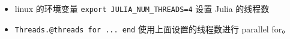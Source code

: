 
\begin{issues}
\issueDraft
\end{issues}

\begin{itemize}
\item linux 的环境变量 \verb`export JULIA_NUM_THREADS=4` 设置 Julia 的线程数
\item \verb`Threads.@threads for ... end` 使用上面设置的线程数进行 parallel for。
\end{itemize}
